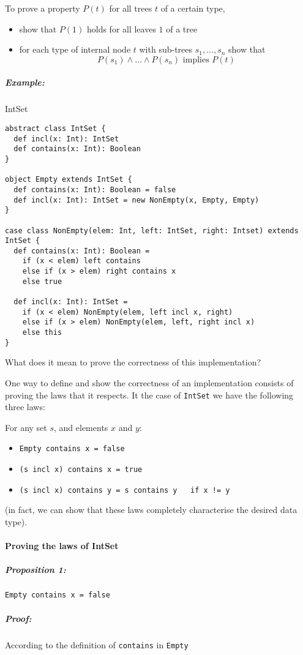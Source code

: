 \documentclass{scrartcl}
\newcommand{\example}{\subparagraph{Example:}} %
\begin{document}
To prove a property $P(t)$ for all trees $t$ of a certain type,
\begin{itemize}
\item show that $P(1)$ holds for all leaves $1$ of a tree
\item for each type of internal node $t$ with sub-trees $s_1, \dots, s_n$ show
  that 
$$P(s_1) \wedge \dots \wedge P(s_n) \text{ implies }P(t)$$
\end{itemize}
\example IntSet

\begin{lstlisting}
abstract class IntSet {
  def incl(x: Int): IntSet
  def contains(x: Int): Boolean
}

object Empty extends IntSet {
  def contains(x: Int): Boolean = false
  def incl(x: Int): IntSet = new NonEmpty(x, Empty, Empty)
}

case class NonEmpty(elem: Int, left: IntSet, right: Intset) extends IntSet {
  def contains(x: Int): Boolean = 
    if (x < elem) left contains
    else if (x > elem) right contains x
    else true

  def incl(x: Int): IntSet = 
    if (x < elem) NonEmpty(elem, left incl x, right)
    else if (x > elem) NonEmpty(elem, left, right incl x)
    else this
}
\end{lstlisting}

What does it mean to prove the correctness of this implementation?

One way to define and show the correctness of an implementation consists of
proving the laws that it respects. It the case of \lstinline|IntSet| we have the
following three laws:

For any set $s$, and elements $x$ and $y$:
\begin{itemize}
\item \lstinline|Empty contains x = false|
\item \lstinline|(s incl x) contains x = true|
\item \lstinline|(s incl x) contains y = s contains y   if x != y|
\end{itemize}
(in fact, we can show that these laws completely characterise the desired data
type). 

\paragraph{Proving the laws of IntSet}

\subparagraph{Proposition 1:} \lstinline|Empty contains x = false|
\subparagraph{Proof:} According to the definition of \lstinline|contains| in
\lstinline|Empty| 
\end{document}
